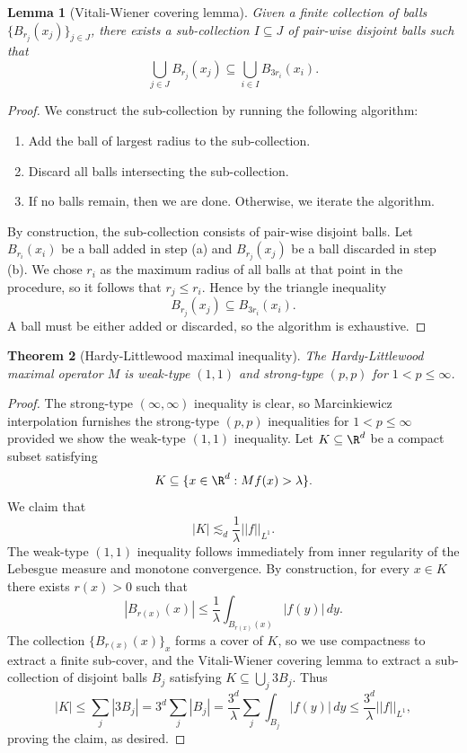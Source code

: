 \documentclass[reqno]{amsart}
\newtheorem{theorem}{Theorem}
\newtheorem{lemma}[theorem]{Lemma}
\theoremstyle{definition}
\theoremstyle{remark}
\begin{document}
\begin{lemma}[Vitali-Wiener covering lemma]
	Given a finite collection of balls $\{ B_{r_j} (x_j) \}_{j \in J}$, there exists a sub-collection $I \subseteq J$ of pair-wise disjoint balls such that
		\[ \bigcup_{j \in J} B_{r_j} (x_j) \subseteq \bigcup_{i \in I} B_{3r_i} (x_i). \]
\end{lemma}

\begin{proof}
	We construct the sub-collection by running the following algorithm:
	\begin{enumerate}
		\item Add the ball of largest radius to the sub-collection.
		\item Discard all balls intersecting the sub-collection. 
		\item If no balls remain, then we are done. Otherwise, we iterate the algorithm. 
	\end{enumerate}
	By construction, the sub-collection consists of pair-wise disjoint balls. Let $B_{r_i} (x_i)$ be a ball added in step (a) and $B_{r_j} (x_j)$ be a ball discarded in step (b). We chose $r_i$ as the maximum radius of all balls at that point in the procedure, so it follows that $r_j \leq r_i$. Hence by the triangle inequality
		\[ B_{r_j} (x_j) \subseteq B_{3r_i} (x_i). \]
	A ball must be either added or discarded, so the algorithm is exhaustive.
\end{proof}

\begin{theorem}[Hardy-Littlewood maximal inequality]
	The Hardy-Littlewood maximal operator $M$ is weak-type $(1, 1)$ and strong-type $(p, p)$ for $1 < p \leq \infty$. 
\end{theorem}

\begin{proof}
	The strong-type $(\infty, \infty)$ inequality is clear, so Marcinkiewicz interpolation furnishes the strong-type $(p, p)$ inequalities for $1 < p \leq \infty$ provided we show the weak-type $(1, 1)$ inequality. Let $K \subseteq \R^d$ be a compact subset satisfying
		\[ K \subseteq \{ x \in \R^d : Mf(x) > \lambda \}. \]
	We claim that 
		\[ |K| \lesssim_d \frac1\lambda ||f||_{L^1}. \]
	The weak-type $(1, 1)$ inequality follows immediately from inner regularity of the Lebesgue measure and monotone convergence. By construction, for every $x \in K$ there exists $r(x) > 0$ such that 
		\[ |B_{r(x)} (x)| \leq \frac1\lambda \int_{B_{r(x)} (x)} |f(y)| \, dy.\]
	The collection $\{B_{r(x)} (x)\}_x$ forms	a cover of $K$, so we use compactness to extract a finite sub-cover, and the Vitali-Wiener covering lemma to extract a sub-collection of disjoint balls $B_j$ satisfying $K \subseteq \bigcup_j 3B_j$. Thus
		\[ |K| \leq \sum_j |3B_j| = 3^d \sum_j |B_j| = \frac{3^d}{\lambda} \sum_j \int_{B_j} |f(y)| \, dy \leq \frac{3^d}{\lambda} ||f||_{L^1}, \]
	proving the claim, as desired. 
\end{proof}
\end{document}
